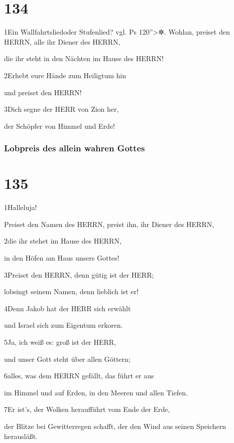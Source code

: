 \hypertarget{section-133}{%
\section{134}\label{section-133}}

1Ein Wallfahrtsliedoder Stufenlied? vgl. Ps 120''\textgreater✲. Wohlan,
preiset den HERRN, alle ihr Diener des HERRN,

die ihr steht in den Nächten im Hause des HERRN!

2Erhebt eure Hände zum Heiligtum hin

und preiset den HERRN!

3Dich segne der HERR von Zion her,

der Schöpfer von Himmel und Erde!

\hypertarget{lobpreis-des-allein-wahren-gottes}{%
\subsubsection{Lobpreis des allein wahren
Gottes}\label{lobpreis-des-allein-wahren-gottes}}

\hypertarget{section-134}{%
\section{135}\label{section-134}}

1Halleluja!

Preiset den Namen des HERRN, preist ihn, ihr Diener des HERRN,

2die ihr stehet im Hause des HERRN,

in den Höfen am Haus unsers Gottes!

3Preiset den HERRN, denn gütig ist der HERR;

lobsingt seinem Namen, denn lieblich ist er!

4Denn Jakob hat der HERR sich erwählt

und Israel sich zum Eigentum erkoren.

5Ja, ich weiß es: groß ist der HERR,

und unser Gott steht über allen Göttern;

6alles, was dem HERRN gefällt, das führt er aus

im Himmel und auf Erden, in den Meeren und allen Tiefen.

7Er ist's, der Wolken heraufführt vom Ende der Erde,

der Blitze bei Gewitterregen schafft, der den Wind aus seinen Speichern
herausläßt.

